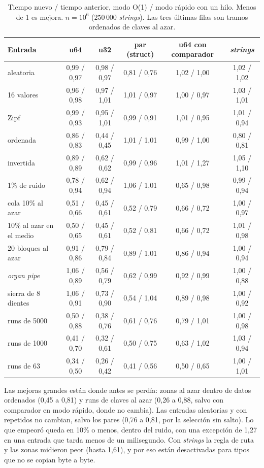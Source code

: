 \documentclass[10pt,a4paper]{article}
\begin{document}
\begin{table}[h]\centering\footnotesize
\begin{tabular}{lccccc}
\toprule
Entrada & u64 & u32 & par (struct) & u64 con comparador & \emph{strings}\\
\midrule
aleatoria & 0,99 / 0,97 & 0,98 / 0,97 & 0,81 / 0,76 & 1,02 / 1,00 & 1,02 / 1,02\\
16 valores & 0,96 / 0,98 & 0,97 / 1,01 & 1,01 / 0,97 & 1,00 / 0,97 & 1,03 / 1,01\\
Zipf & 0,99 / 0,93 & 0,95 / 1,01 & 0,99 / 0,91 & 1,01 / 0,95 & 1,01 / 0,94\\
ordenada & 0,86 / 0,83 & 0,44 / 0,45 & 1,01 / 1,01 & 0,99 / 1,00 & 0,80 / 0,81\\
invertida & 0,89 / 0,89 & 0,62 / 0,62 & 0,99 / 0,96 & 1,01 / 1,27 & 1,05 / 1,10\\
1\% de ruido & 0,78 / 0,94 & 0,62 / 0,94 & 1,06 / 1,01 & 0,65 / 0,98 & 0,99 / 0,94\\
cola 10\% al azar & 0,51 / 0,66 & 0,45 / 0,61 & 0,52 / 0,79 & 0,66 / 0,72 & 1,00 / 0,97\\
10\% al azar en el medio & 0,50 / 0,65 & 0,45 / 0,61 & 0,52 / 0,81 & 0,66 / 0,72 & 1,01 / 0,98\\
20 bloques al azar & 0,91 / 0,86 & 0,79 / 0,84 & 0,89 / 1,01 & 0,86 / 0,94 & 1,00 / 0,94\\
\emph{organ pipe} & 1,06 / 0,89 & 0,56 / 0,79 & 0,62 / 0,99 & 0,92 / 0,99 & 1,00 / 0,88\\
sierra de 8 dientes & 1,06 / 0,91 & 0,73 / 0,90 & 0,54 / 1,04 & 0,89 / 0,98 & 1,00 / 0,92\\
runs de 5000 & 0,50 / 0,88 & 0,38 / 0,76 & 0,61 / 0,76 & 0,79 / 1,01 & 1,00 / 0,98\\
runs de 1000 & 0,41 / 0,70 & 0,32 / 0,61 & 0,50 / 0,75 & 0,63 / 1,02 & 1,03 / 0,94\\
runs de 63 & 0,34 / 0,50 & 0,26 / 0,42 & 0,41 / 0,56 & 0,50 / 0,65 & 1,00 / 1,01\\
\bottomrule
\end{tabular}
\caption{Tiempo nuevo / tiempo anterior, modo O(1) / modo rápido con un hilo. Menos de 1
es mejora. $n=10^6$ ($250\,000$ \emph{strings}). Las tres últimas filas son tramos
ordenados de claves al azar.}\label{tab:ab}
\end{table}

\noindent Las mejoras grandes están donde antes se perdía: zonas al azar dentro de
datos ordenados (0,45 a 0,81) y runs de claves al azar (0,26 a 0,88, salvo con
comparador en modo rápido, donde no cambia). Las entradas
aleatorias y con repetidos no cambian, salvo los pares (0,76 a 0,81, por la selección
sin salto). Lo que empeoró queda en 10\% o menos, dentro del ruido, con una excepción
de 1,27 en una entrada que tarda menos de un milisegundo. Con \emph{strings} la regla de
ruta y las zonas midieron peor (hasta 1,61), y por eso están desactivadas para tipos
que no se copian byte a byte.
\end{document}
